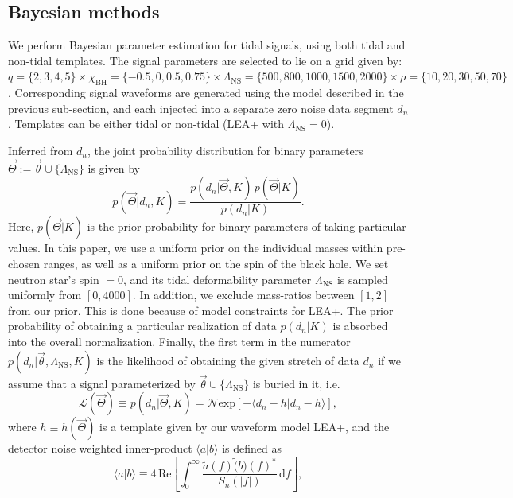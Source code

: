 \documentclass[aps,prd,amsmath,floats,floatfix, twocolumn,
superscriptaddress,nofootinbib,showpacs]{revtex4-1}
\newcommand{\D}{\mathrm{d}}
\newcommand{\lambdans}{\Lambda_\mathrm{NS}}
\newcommand{\chibh}{\chi_\mathrm{BH}}
\newcommand{\LL}{\mathcal{L}}
\begin{document}
\subsection{Bayesian methods}\label{s2:bayesian}

We perform Bayesian parameter estimation for tidal signals, using
both tidal and non-tidal templates. The signal parameters are selected 
to lie on a grid given by:
$q=\{2,3,4,5\}\times\chibh=\{-0.5,0,0.5,0.75\}\times\lambdans=\{500,800,1000,1500,2000\}\times\rho=\{10,20,30,50,70\}$.
Corresponding signal waveforms are generated using the model described in the 
previous sub-section, and each injected into a separate zero noise data segment
$d_n$. Templates can be either tidal or non-tidal (LEA+ with $\lambdans=0$).

Inferred from $d_n$, the joint probability distribution for binary parameters
$\vec{\Theta}:=\vec{\theta}\cup\{\lambdans\}$ is given by
\begin{equation}\label{eq:postprob}
 p(\vec{\Theta} | d_n, K) = \dfrac{p(d_n|\vec{\Theta}, K)\,p(\vec{\Theta} | K)}{p(d_n|K)}.
\end{equation}
Here, $p(\vec{\Theta} | K)$ is the prior probability for binary parameters of
taking particular values. In this paper, we use a uniform prior on the
individual masses within pre-chosen ranges, as well as a uniform prior on the
spin of the black hole. We set neutron star's spin $=0$, and its tidal
deformability parameter $\lambdans$ is sampled uniformly from $[0, 4000]$. In
addition, we exclude mass-ratios between $[1,2]$ from our prior. This is done
because of model constraints for LEA+. The prior probability of obtaining a 
particular realization of data $p(d_n|K)$ is absorbed into the overall 
normalization. Finally, the first term in the numerator
$p(d_n|\vec{\theta}, \lambdans, K)$ is the likelihood of obtaining the given
stretch of data $d_n$ if we assume that a signal parameterized by
$\vec{\theta}\cup\{\lambdans\}$ is buried in it, i.e.
\begin{equation}\label{eq:likelihood}
 \LL(\vec{\Theta}) \equiv p(d_n| \vec{\Theta}, K) = \mathcal{N} \mathrm{exp}[- \langle d_n - h | d_n - h\rangle ],
\end{equation}
where $h\equiv h(\vec{\Theta})$ is a template given by our waveform model LEA+,
and the detector noise weighted inner-product $\langle a|b\rangle$ is defined 
as
\begin{equation}
\langle a|b\rangle \equiv 4\,\mathrm{Re}\left[\int_0^\infty \dfrac{\tilde{a}(f) \tilde(b)(f)^*}{S_n(|f|)}\,\D f\right],
\end{equation}
\end{document}
